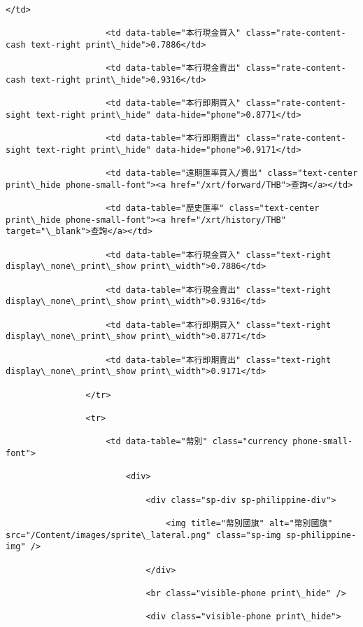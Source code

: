 \documentclass[11pt]{article}
\begin{document}
\begin{Verbatim}[commandchars=\\\{\}]
                    </td>

                    <td data-table="本行現金買入" class="rate-content-cash text-right print\_hide">0.7886</td>

                    <td data-table="本行現金賣出" class="rate-content-cash text-right print\_hide">0.9316</td>

                    <td data-table="本行即期買入" class="rate-content-sight text-right print\_hide" data-hide="phone">0.8771</td>

                    <td data-table="本行即期賣出" class="rate-content-sight text-right print\_hide" data-hide="phone">0.9171</td>

                    <td data-table="遠期匯率買入/賣出" class="text-center print\_hide phone-small-font"><a href="/xrt/forward/THB">查詢</a></td>

                    <td data-table="歷史匯率" class="text-center print\_hide phone-small-font"><a href="/xrt/history/THB" target="\_blank">查詢</a></td>

                    <td data-table="本行現金買入" class="text-right display\_none\_print\_show print\_width">0.7886</td>

                    <td data-table="本行現金賣出" class="text-right display\_none\_print\_show print\_width">0.9316</td>

                    <td data-table="本行即期買入" class="text-right display\_none\_print\_show print\_width">0.8771</td>

                    <td data-table="本行即期賣出" class="text-right display\_none\_print\_show print\_width">0.9171</td>

                </tr>

                <tr>

                    <td data-table="幣別" class="currency phone-small-font">

                        <div>

                            <div class="sp-div sp-philippine-div">

                                <img title="幣別國旗" alt="幣別國旗" src="/Content/images/sprite\_lateral.png" class="sp-img sp-philippine-img" />

                            </div>

                            <br class="visible-phone print\_hide" />

                            <div class="visible-phone print\_hide">


\end{Verbatim}
\end{document}
